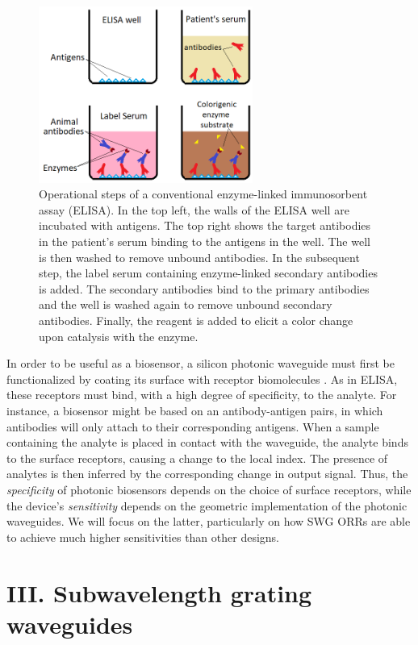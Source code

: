 \documentclass[aps,prl,twocolumn, superscriptaddress,nobalancelastpage]{revtex4}
\begin{document}
 \begin{figure}[!h]
    \centering
    \includegraphics[width=7cm]{ELISA_well.png}
    \caption{Operational steps of a conventional enzyme-linked immunosorbent assay (ELISA). In the top left, the walls of the ELISA well are incubated with antigens. The top right shows the target antibodies in the patient's serum binding to the antigens in the well. The well is then washed to remove unbound antibodies. In the subsequent step, the label serum containing enzyme-linked secondary antibodies is added. The secondary antibodies bind to the primary antibodies and the well is washed again to remove unbound secondary antibodies. Finally, the reagent is added to elicit a color change upon catalysis with the enzyme.}
    \label{fig:ELISA_well}
\end{figure}

In order to be useful as a biosensor, a silicon photonic waveguide must first be functionalized by coating its surface with receptor biomolecules \cite{swg1}. As in ELISA, these receptors must bind, with a high degree of specificity, to the analyte. For instance, a biosensor might be based on an antibody-antigen pairs, in which antibodies will only attach to their corresponding antigens. When a sample containing the analyte is placed in contact with the waveguide, the analyte binds to the surface receptors, causing a change to the local index. The presence of analytes is then inferred by the corresponding change in output signal. Thus, the \textit{specificity} of photonic biosensors depends on the choice of surface receptors, while the device's \textit{sensitivity} depends on the geometric implementation of the photonic waveguides. We will focus on the latter, particularly on how SWG ORRs are able to achieve much higher sensitivities than other designs.

\vspace{-1em}
\section{III. Subwavelength grating waveguides}
\vspace{-1em}
\end{document}
